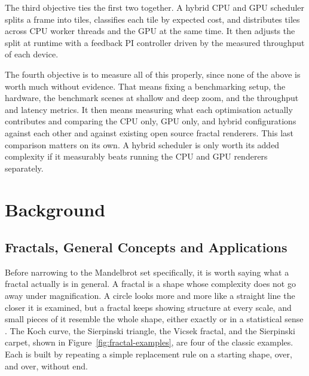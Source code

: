 \documentclass{ftndiplomski}
\begin{document}
The third objective ties the first two together. A hybrid CPU and GPU scheduler splits a frame
into tiles, classifies each tile by expected cost, and distributes tiles across CPU worker threads
and the GPU at the same time. It then adjusts the split at runtime with a feedback PI controller
driven by the measured throughput of each device.

The fourth objective is to measure all of this properly, since none of the above is worth much
without evidence. That means fixing a benchmarking setup, the hardware, the benchmark scenes at
shallow and deep zoom, and the throughput and latency metrics. It then means measuring what each
optimisation actually contributes and comparing the CPU only, GPU only, and hybrid configurations
against each other and against existing open source fractal renderers. This last comparison
matters on its own. A hybrid scheduler is only worth its added complexity if it measurably beats
running the CPU and GPU renderers separately.

\chapter{Background}
\label{ch:background}

\section{Fractals, General Concepts and Applications}
\label{sec:fractal-concepts}

Before narrowing to the Mandelbrot set specifically, it is worth saying what a fractal actually is
in general. A fractal is a shape whose complexity does not go away under magnification. A circle
looks more and more like a straight line the closer it is examined, but a fractal keeps showing
structure at every scale, and small pieces of it resemble the whole shape, either exactly or in a
statistical sense \cite{mandelbrot1982}. The Koch curve, the Sierpinski triangle, the Vicsek
fractal, and the Sierpinski carpet, shown in Figure~\ref{fig:fractal-examples}, are four of the
classic examples. Each is built by repeating a simple replacement rule on a starting shape, over,
and over, without end.
\end{document}
